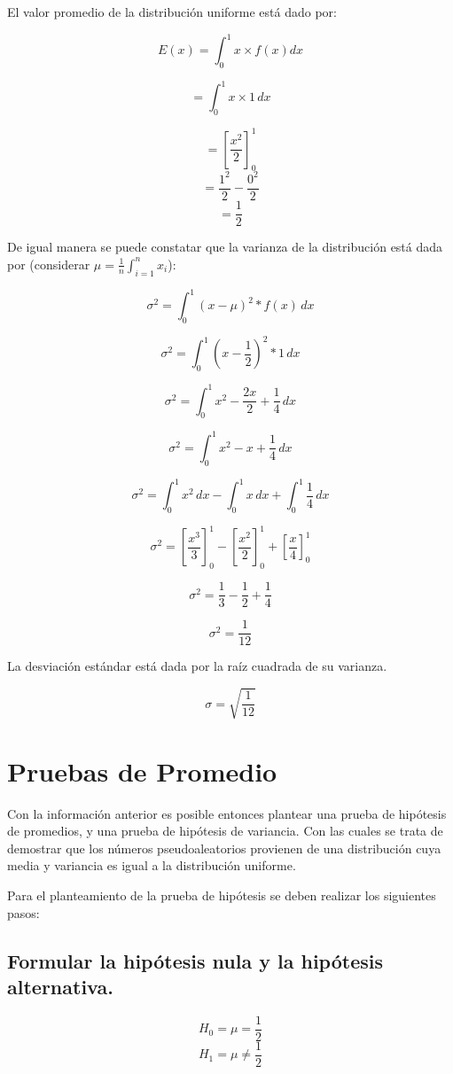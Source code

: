 El valor promedio de la distribución uniforme está dado por:

$$E(x) = \int_{0}^1 x \times f(x)dx$$

$$= \int_{0}^{1} x \times 1 \, {dx}$$

$$
= \left[ \frac{x^2}{2} \right]_{0}^{1}$$ 
$$ = \frac{1^2}{2} - \frac{0^2}{2} $$ 
$$= \frac{1}{2} $$

De igual manera se puede constatar que la varianza de la distribución está dada por (considerar $\mu = \frac{1}{n} \int_{i=1}^{n} x_i$):


$$\sigma^2 = \int_{0}^{1} (x-\mu)^2 * f(x) \, dx$$

$$\sigma^2 = \int_{0}^{1} (x-\frac{1}{2})^2 * 1 \, dx$$

$$\sigma^2 = \int_{0}^{1} x^2- \frac{2x}{2} + \frac{1}{4} \, dx$$

$$\sigma^2 = \int_{0}^{1} x^2- x+ \frac{1}{4} \, dx$$

$$
\sigma^2 = \int_{0}^{1} x^2 \, dx - \int_{0}^{1} x \, dx + \int_{0}^{1} \frac{1}{4} \, dx
$$

$$
\sigma^2 = \left[ \frac{x^3}{3} \right]_{0}^{1} - \left[ \frac{x^2}{2} \right]_{0}^{1} + \left[ \frac{x}{4} \right]_{0}^{1}
$$

$$
\sigma^2 = \frac{1}{3} - \frac{1}{2} + \frac{1}{4}
$$

$$\sigma^2 = \frac{1}{12}$$

La desviación estándar está dada por la raíz cuadrada de su varianza.

$$\sigma = \sqrt{\frac{1}{12}}$$

\section{Pruebas de Promedio}

Con la información anterior es posible entonces plantear una prueba de hipótesis de promedios, y una prueba de hipótesis de variancia. Con las cuales se trata de demostrar que los números pseudoaleatorios provienen de una distribución cuya media y variancia es igual a la distribución uniforme.


Para el planteamiento de la prueba de hipótesis se deben realizar los siguientes pasos:


\subsection{Formular la hipótesis nula y la hipótesis alternativa.}
$$H_0 = \mu = \frac{1}{2}$$
$$H_1 = \mu \not = \frac{1}{2}$$

